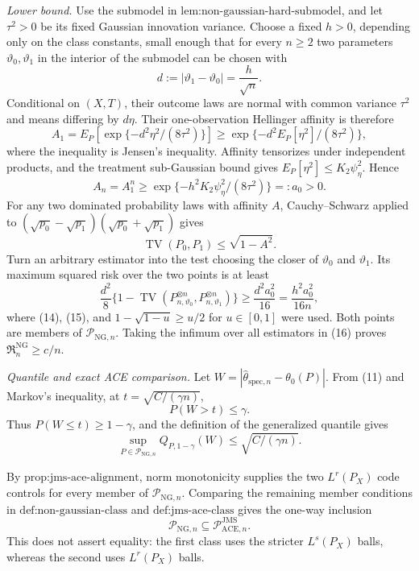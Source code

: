 \emph{Lower bound.}
Use the submodel in \(\text{lem:non-gaussian-hard-submodel}\), and let
\(\tau^2>0\) be its fixed Gaussian innovation variance.  Choose a fixed
\(h>0\), depending only on the class constants, small enough that for
every \(n\ge2\) two parameters \(\vartheta_0,\vartheta_1\) in the
interior of the submodel can be chosen with
\[
 d:=|\vartheta_1-\vartheta_0|=\frac h{\sqrt n}.
\]
Conditional on \((X,T)\), their outcome laws are normal with common
variance \(\tau^2\) and means differing by \(d\eta\).  Their
one-observation Hellinger affinity is therefore
\[
 A_1=E_P\!\left[\exp\{-d^2\eta^2/(8\tau^2)\}\right]
 \ge \exp\{-d^2E_P[\eta^2]/(8\tau^2)\},                \tag{13}
\]
where the inequality is Jensen's inequality.  Affinity tensorizes under
independent products, and the treatment sub-Gaussian bound gives
\(E_P[\eta^2]\le K_2\psi_{\eta}^2\).  Hence
\[
 A_n=A_1^n
 \ge \exp\{-h^2K_2\psi_{\eta}^2/(8\tau^2)\}
 =:a_0>0.                                               \tag{14}
\]
For any two dominated probability laws with affinity \(A\),
Cauchy--Schwarz applied to
\((\sqrt{p_0}-\sqrt{p_1})(\sqrt{p_0}+\sqrt{p_1})\) gives
\[
 \operatorname{TV}(P_0,P_1)\le\sqrt{1-A^2}.            \tag{15}
\]
Turn an arbitrary estimator into the test choosing the closer of
\(\vartheta_0\) and \(\vartheta_1\).  Its maximum squared risk over the
two points is at least
\[
 \frac{d^2}{8}
 \{1-\operatorname{TV}(P_{n,\vartheta_0}^{\otimes n},
                       P_{n,\vartheta_1}^{\otimes n})\}
 \ge \frac{d^2a_0^2}{16}
 =\frac{h^2a_0^2}{16n},                                 \tag{16}
\]
where (14), (15), and
\(1-\sqrt{1-u}\ge u/2\) for \(u\in[0,1]\) were used.  Both points are
members of \(\mathcal P_{\mathrm{NG},n}\).  Taking the infimum over all
estimators in (16) proves \(\mathfrak R_n^{\mathrm{NG}}\ge c/n\).

\emph{Quantile and exact ACE comparison.}
Let
\(W=|\widehat\theta_{\mathrm{spec},n}-\theta_0(P)|\).  From (11) and
Markov's inequality, at \(t=\sqrt{C/(\gamma n)}\),
\[
 P(W>t)\le\gamma.
\]
Thus \(P(W\le t)\ge1-\gamma\), and the definition of the generalized
quantile gives
\[
 \sup_{P\in\mathcal P_{\mathrm{NG},n}}
 Q_{P,1-\gamma}(W)\le\sqrt{C/(\gamma n)}.               \tag{17}
\]

By \(\text{prop:jms-ace-alignment}\), norm monotonicity supplies the two
\(L^r(P_X)\) code controls for every member of
\(\mathcal P_{\mathrm{NG},n}\).  Comparing the remaining member
conditions in \(\text{def:non-gaussian-class}\) and
\(\text{def:jms-ace-class}\) gives the one-way inclusion
\[
 \mathcal P_{\mathrm{NG},n}
 \subseteq\mathcal P_{\mathrm{ACE},n}^{\mathrm{JMS}}.   \tag{18}
\]
This does not assert equality: the first class uses the stricter
\(L^s(P_X)\) balls, whereas the second uses \(L^r(P_X)\) balls.

